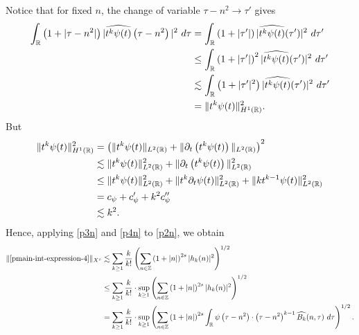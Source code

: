 %
%
Notice that for fixed $n$, the change of variable $\tau - n^{2} \to \tau'$
gives
%
%
\begin{equation}
  \label{p3n}
  \begin{split}
    \int_{\mathbb{R}} \left( 1 + | \tau - n^{2} | \right) | \widehat{t^{k}
    \psi(t)}\left( \tau - n^{2} \right) |^2 \ d \tau
    & = \int_{\mathbb{R}} \left( 1 + |\tau'| \right) | \widehat{t^k \psi(t)}(\tau') |^2 \
    d \tau'
    \\
    & \le \int_{\mathbb{R}} \left( 1 + |\tau'| \right)^2 | \widehat{t^k \psi(t)}(\tau')
    |^2 \ d \tau'
    \\
    & \lesssim \int_{\mathbb{R}} \left( 1 + | \tau' |^2 \right) | \widehat{t^{k}
    \psi(t)}(\tau') |^2 \ d \tau'
    \\
    & = \|t^k \psi(t) \|_{H^1(\mathbb{R})}^2.
  \end{split}
\end{equation}
%
%
But
%
%
\begin{equation}
  \label{p4n}
  \begin{split}
    \|t^k \psi(t) \|_{H^1(\mathbb{R})}^2
    & = \left( \|t^k \psi(t)\|_{L^2(\mathbb{R})} + \|\partial_t \left( t^k \psi(t)
    \right)\|_{L^2(\mathbb{R})} \right)^2
    \\
    & \lesssim \|t^{k}\psi(t) \|_{L^2(\mathbb{R})}^2 + \|\partial_t \left (t^{k}
    \psi(t) \right )\|_{L^2(\mathbb{R})}^2
    \\
    & \le \|t^k \psi(t) \|_{L^2(\mathbb{R})}^2 + \|t^k \partial_t \psi(t)
    \|_{L^2(\mathbb{R})}^2 + \|k t^{k -1} \psi(t) \|_{L^2(\mathbb{R})}^2
    \\
    & = c_{\psi} + c_{\psi}' + k^2 c_{\psi}''
    \\
    & \lesssim k^2.
  \end{split}
\end{equation}
%
%
Hence, applying \eqref{p3n} and \eqref{p4n} to \eqref{p2n}, we obtain
%
\begin{equation}
  \label{p5n}
  \begin{split}
    \|\eqref{pmain-int-expression-4} \|_{X^s}
    & \lesssim
    \sum_{k \ge 1} \frac{k}{k!} \left( \sum_{n \in \mathbb{Z}} \left (1 + |n| \right )^{2s} | h_k(n) |^2 
    \right)^{1/2}
    \\
    & \le \sum_{k \ge 1} \frac{k}{k!}
    \cdot \sup_{k \ge 1} \left( \sum_{n \in \mathbb{Z}} \left (1 + |n| \right )^{2s} | 
    h_k(n) |^2 \right)^{1/2}
    \\
    & = \sum_{k \ge 1} \frac{k}{k!} \cdot \sup_{k \ge 1} 
    \left( \sum_{n \in \mathbb{Z}} \left (1 + |n| \right )^{2s} \int_{\mathbb{R}} 
    \psi\left( \tau - n^{2} \right) \cdot \left( \tau - n^{2} 
    \right)^{k -1} \widehat{{B_k}}(n, \tau) \ d \tau \right)^{1/2}.
  \end{split}
\end{equation}
